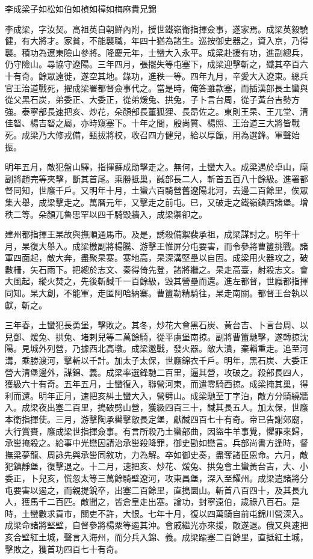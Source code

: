 
\begin{pinyinscope}
李成梁子如松如伯如楨如樟如梅麻貴兄錦

李成梁，字汝契。高祖英自朝鮮內附，授世鐵嶺衛指揮僉事，遂家焉。成梁英毅驍健，有大將才。家貧，不能襲職，年四十猶為諸生。巡按御史器之，資入京，乃得襲。積功為遼東險山參將。隆慶元年，士蠻大入永平。成梁赴援有功，進副總兵，仍守險山。尋協守遼陽。三年四月，張擺失等屯塞下，成梁迎擊斬之，殲其卒百六十有奇。餘眾遠徙，遂空其地。錄功，進秩一等。四年九月，辛愛大入遼東。總兵官王治道戰死，擢成梁署都督僉事代之。當是時，俺答雖款塞，而插漢部長土蠻與從父黑石炭，弟委正、大委正，從弟煖兔、拱兔，子卜言台周，從子黃台吉勢方強。泰寧部長速把亥、炒花，朵顏部長董狐狸、長昂佐之。東則王杲、王兀堂、清佳砮、楊吉砮之屬，亦時窺塞下。十年之間，殷尚質、楊照、王治道三大將皆戰死。成梁乃大修戎備，甄拔將校，收召四方健兒，給以厚餼，用為選鋒。軍聲始振。

明年五月，敵犯盤山驛，指揮蘇成勛擊走之。無何，土蠻大入。成梁遇於卓山，麾副將趙完等夾擊，斷其首尾。乘勝抵巢，馘部長二人，斬首五百八十餘級。進署都督同知，世廕千戶。又明年十月，土蠻六百騎營舊遼陽北河，去邊二百餘里，俟眾集大舉，成梁擊走之。萬曆元年，又擊走之前屯。已，又破走之鐵嶺鎮西諸堡。增秩二等。朵顏兀魯思罕以四千騎毀牆入，成梁禦卻之。

建州都指揮王杲故與撫順通馬市。及是，誘殺備禦裴承祖，成梁謀討之。明年十月，杲復大舉入。成梁檄副將楊騰、游擊王惟屏分屯要害，而令參將曹簠挑戰。諸軍四面起，敵大奔，盡聚杲寨。寨地高，杲深溝堅壘以自固。成梁用火器攻之，破數柵，矢石雨下。把總於志文、秦得倚先登，諸將繼之。杲走高臺，射殺志文。會大風起，縱火焚之，先後斬馘千一百餘級，毀其營壘而還。進左都督，世廕都指揮同知。杲大創，不能軍，走匿阿哈納寨。曹簠勒精騎往，杲走南關。都督王台執以獻，斬之。

三年春，土蠻犯長勇堡，擊敗之。其冬，炒花大會黑石炭、黃台吉、卜言台周、以兒鄧、煖兔、拱兔、堵剌兒等二萬餘騎，從平虜堡南掠。副將曹簠馳擊，遂轉掠沈陽。見城外列營，乃據西北高墩。成梁邀戰，發火器。敵大潰，棄輜重走。追至河溝，乘勝渡河，擊斬以千計。加太子太保，世廕錦衣千戶。明年，黑石炭、大委正營大清堡邊外，謀錦、義。成梁率選鋒馳二百里，逼其營，攻破之。殺部長四人，獲級六十有奇。五年五月，士蠻復入，聯營河東，而遣零騎西掠。成梁掩其巢，得利而還。明年正月，速把亥糾土蠻大入，營劈山。成梁馳至丁字泊，敵方分騎繞牆入。成梁夜出塞二百里，搗破劈山營，獲級四百三十，馘其長五人。加太保，世廕本衛指揮使。三月，游擊陶承嚳擊敵長定堡，獻馘四百七十有奇。帝已告謝郊廟，大行賞賚，廕成梁世指揮僉事。有言所殺乃土蠻部曲，因盜牛羊事覺，懼罪來歸，承嚳掩殺之。給事中光懋因請治承嚳殺降罪，御史勘如懋言。兵部尚書方逢時，督撫梁夢龍、周詠先與承嚳同敘功，力為解。卒如御史奏，盡奪諸臣恩命。六月，敵犯鎮靜堡，復擊退之。十二月，速把亥、炒花、煖兔、拱兔會土蠻黃台吉，大、小委正，卜兒亥，慌忽太等三萬餘騎壁遼河，攻東昌堡，深入至耀州。成梁遣諸將分屯要害以遏之，而親提銳卒，出塞二百餘里，直搗圜山。斬首八百四十，及其長九人，獲馬千二百匹。敵聞之，皆倉皇走出塞。論功，封寧遠伯，歲祿八百石。是時，土蠻數求貢市，關吏不許，大恨。七年十月，復以四萬騎自前屯錦川營深入。成梁命諸將堅壁，自督參將楊粟等遏其沖。會戚繼光亦來援，敵遂退。俄又與速把亥合壁紅土城，聲言入海州，而分兵入錦、義。成梁踰塞二百餘里，直抵紅土城，擊敗之，獲首功四百七十有奇。


\end{pinyinscope}
